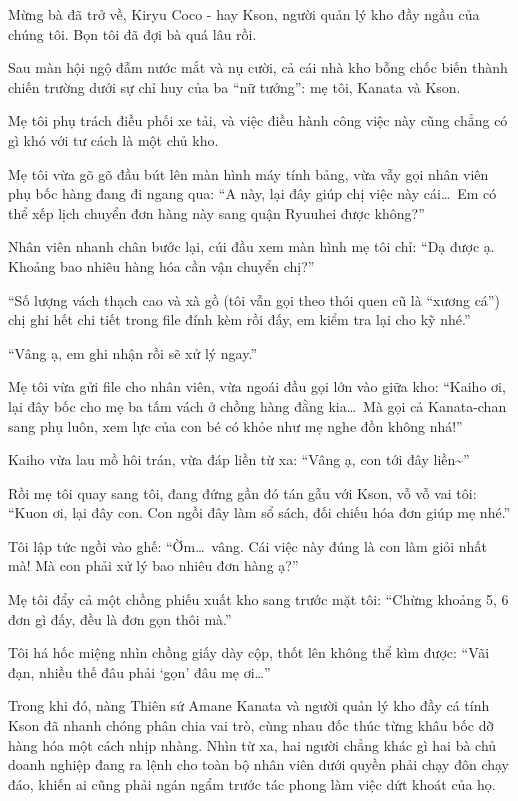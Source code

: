 \documentclass[../main.tex]{subfiles}
\begin{document}
Mừng bà đã trở về, Kiryu Coco - hay Kson, người quản lý kho đầy ngầu của chúng tôi. Bọn tôi đã đợi bà quá lâu rồi.

\omk


Sau màn hội ngộ đẫm nước mắt và nụ cười, cả cái nhà kho bỗng chốc biến thành chiến trường dưới sự chỉ huy của ba ``nữ tướng'': mẹ tôi, Kanata và Kson.

Mẹ tôi phụ trách điều phối xe tải, và việc điều hành công việc này cũng chẳng có gì khó với tư cách là một chủ kho.

Mẹ tôi vừa gõ gõ đầu bút lên màn hình máy tính bảng, vừa vẫy gọi nhân viên phụ bốc hàng đang đi ngang qua: ``A này, lại đây giúp chị việc này cái\dots\ Em có thể xếp lịch chuyển đơn hàng này sang quận Ryuuhei được không?''

Nhân viên nhanh chân bước lại, cúi đầu xem màn hình mẹ tôi chỉ: ``Dạ được ạ. Khoảng bao nhiêu hàng hóa cần vận chuyển chị?''

``Số lượng vách thạch cao và xà gồ (tôi vẫn gọi theo thói quen cũ là ``xương cá'') chị ghi hết chi tiết trong file đính kèm rồi đấy, em kiểm tra lại cho kỹ nhé.''

``Vâng ạ, em ghi nhận rồi sẽ xử lý ngay.''

Mẹ tôi vừa gửi file cho nhân viên, vừa ngoái đầu gọi lớn vào giữa kho: ``Kaiho ơi, lại đây bốc cho mẹ ba tấm vách ở chồng hàng đằng kia\dots\ Mà gọi cả Kanata-chan sang phụ luôn, xem lực của con bé có khỏe như mẹ nghe đồn không nhá!''

Kaiho vừa lau mồ hôi trán, vừa đáp liền từ xa: ``Vâng ạ, con tới đây liền\~{}''

Rồi mẹ tôi quay sang tôi, đang đứng gần đó tán gẫu với Kson, vỗ vỗ vai tôi: ``Kuon ơi, lại đây con. Con ngồi đây làm sổ sách, đối chiếu hóa đơn giúp mẹ nhé.''

Tôi lập tức ngồi vào ghế: ``Ờm\dots\ vâng. Cái việc này đúng là con làm giỏi nhất mà! Mà con phải xử lý bao nhiêu đơn hàng ạ?''

Mẹ tôi đẩy cả một chồng phiếu xuất kho sang trước mặt tôi: ``Chừng khoảng 5, 6 đơn gì đấy, đều là đơn gọn thôi mà.''

Tôi há hốc miệng nhìn chồng giấy dày cộp, thốt lên không thể kìm được: ``Vãi đạn, nhiều thế đâu phải `gọn' đâu mẹ ơi\dots''

Trong khi đó, nàng Thiên sứ Amane Kanata và người quản lý kho đầy cá tính Kson đã nhanh chóng phân chia vai trò, cùng nhau đốc thúc từng khâu bốc dỡ hàng hóa một cách nhịp nhàng. Nhìn từ xa, hai người chẳng khác gì hai bà chủ doanh nghiệp đang ra lệnh cho toàn bộ nhân viên dưới quyền phải chạy đôn chạy đáo, khiến ai cũng phải ngán ngẩm trước tác phong làm việc dứt khoát của họ.
\end{document}
